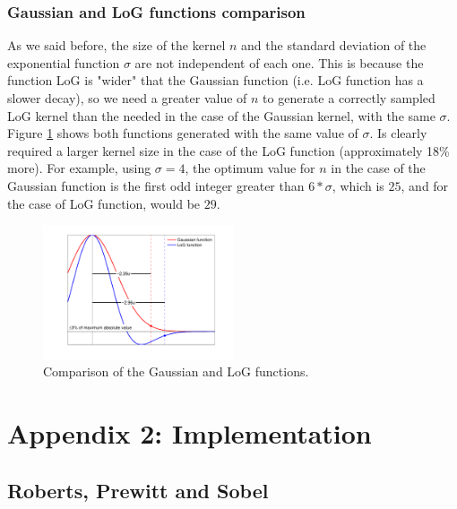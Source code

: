 \documentclass{ipol}
\numberwithin{equation}{section}
\numberwithin{table}{section}
\numberwithin{figure}{section}
\begin{document}
\subsubsection{Gaussian and LoG functions comparison}

As we said before, the size of the kernel $n$ and the standard deviation of the exponential function 
$\sigma$ are not independent of each one. This is because the function LoG is "wider" that the 
Gaussian function (i.e. LoG function has a slower decay), so we need a greater value of $n$ to 
generate a correctly sampled LoG kernel than the needed in the case of the Gaussian kernel, with the same $\sigma$.\\

Figure \ref{fig:kernels} shows both functions generated with the same value of $\sigma$. Is clearly 
required a larger kernel size in the case of the LoG function (approximately 18\% more). For 
example, using $\sigma=4$, the optimum value for $n$ in the case of the Gaussian function is the 
first odd integer greater than $6*\sigma$, which is $25$, and for the case of LoG function, would 
be $29$.\\

\begin{figure}
	\centering
	\includegraphics[width=0.5\textwidth]{kernels.pdf}
	\caption{Comparison of the Gaussian and LoG functions.}
	\label{fig:kernels}
\end{figure}

\clearpage
\section{Appendix 2: Implementation}
\label{sec:appendix2}

\subsection{Roberts, Prewitt and Sobel}

\end{document}

